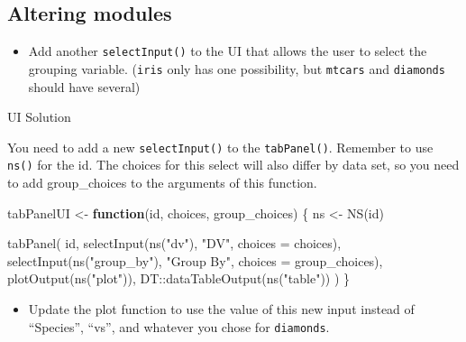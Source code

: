 \documentclass[
  oneside]{book}
\newenvironment{Shaded}{\begin{snugshade}}{\end{snugshade}}
\newcommand{\AttributeTok}[1]{\textcolor[rgb]{0.77,0.63,0.00}{#1}}
\newcommand{\ControlFlowTok}[1]{\textcolor[rgb]{0.13,0.29,0.53}{\textbf{#1}}}
\newcommand{\FunctionTok}[1]{\textcolor[rgb]{0.00,0.00,0.00}{#1}}
\newcommand{\NormalTok}[1]{#1}
\newcommand{\OtherTok}[1]{\textcolor[rgb]{0.56,0.35,0.01}{#1}}
\newcommand{\SpecialCharTok}[1]{\textcolor[rgb]{0.00,0.00,0.00}{#1}}
\newcommand{\StringTok}[1]{\textcolor[rgb]{0.31,0.60,0.02}{#1}}
\providecommand{\tightlist}{%
  \setlength{\itemsep}{0pt}\setlength{\parskip}{0pt}}
\begin{document}
\hypertarget{altering-modules}{%
\subsection*{Altering modules}\label{altering-modules}}

\begin{itemize}
\tightlist
\item
  Add another \texttt{selectInput}\texttt{()} to the UI that allows the user to select the grouping variable. (\texttt{iris} only has one possibility, but \texttt{mtcars} and \texttt{diamonds} should have several)
\end{itemize}

UI Solution

You need to add a new \texttt{selectInput}\texttt{()} to the \texttt{tabPanel}\texttt{()}. Remember to use \texttt{ns}\texttt{()} for the id. The choices for this select will also differ by data set, so you need to add \AttributeTok{group\_choices} to the arguments of this function.

\begin{Shaded}
\begin{Highlighting}[]
\NormalTok{tabPanelUI }\OtherTok{\textless{}{-}} \ControlFlowTok{function}\NormalTok{(id, choices, group\_choices) \{}
\NormalTok{    ns }\OtherTok{\textless{}{-}} \FunctionTok{NS}\NormalTok{(id)}
    
    \FunctionTok{tabPanel}\NormalTok{(}
\NormalTok{        id,}
        \FunctionTok{selectInput}\NormalTok{(}\FunctionTok{ns}\NormalTok{(}\StringTok{"dv"}\NormalTok{), }\StringTok{"DV"}\NormalTok{, }\AttributeTok{choices =}\NormalTok{ choices),}
        \FunctionTok{selectInput}\NormalTok{(}\FunctionTok{ns}\NormalTok{(}\StringTok{"group\_by"}\NormalTok{), }\StringTok{"Group By"}\NormalTok{, }\AttributeTok{choices =}\NormalTok{ group\_choices),}
        \FunctionTok{plotOutput}\NormalTok{(}\FunctionTok{ns}\NormalTok{(}\StringTok{"plot"}\NormalTok{)),}
\NormalTok{        DT}\SpecialCharTok{::}\FunctionTok{dataTableOutput}\NormalTok{(}\FunctionTok{ns}\NormalTok{(}\StringTok{"table"}\NormalTok{))}
\NormalTok{    )}
\NormalTok{\}}
\end{Highlighting}
\end{Shaded}

\begin{itemize}
\tightlist
\item
  Update the plot function to use the value of this new input instead of ``Species'', ``vs'', and whatever you chose for \texttt{diamonds}.
\end{itemize}
\end{document}
